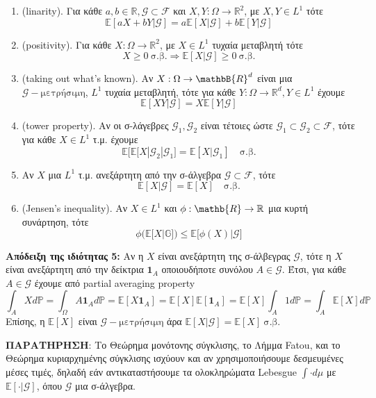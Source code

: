 \documentclass[12pt,a4paper]{article}
\theoremstyle{definition}
\numberwithin{equation}{section}
\begin{document}
\begin{enumerate}
\item \textlatin{(linarity)}. Για κάθε \(a,b \in \mathbb{R}, \mathcal{G} \subset \mathcal{F}\) και \(X,Y : \Omega \rightarrow \mathbb{R}^2\), με \(X,Y \in L^1\) τότε
$$ \mathbb{E}[ aX + bY | \mathcal{G}] = a \mathbb{E}[X|\mathcal{G}] + b \mathbb{E}[Y|\mathcal{G}]$$
\item \textlatin{(positivity)}. Για κάθε \(X:\Omega \rightarrow \mathbb{R}^2\), με \(X \in L^1\) τυχαία μεταβλητή τότε
$$ X \geq 0 \: \text{σ.β.} \Rightarrow \mathbb{E}[X|\mathcal{G}] \geq 0 \: \text{σ.β.} $$
\item \textlatin{(taking out what's known)}. Αν \(X: \Omega \rightarrow \mathbB{R}^d\) είναι μια \(\mathcal{G}-\text{μετρήσιμη}\), \(L^1\) τυχαία μεταβλητή, τότε για κάθε \(Y:\Omega \rightarrow \mathbb{R}^d, Y \in L^1\) έχουμε
$$ \mathbb{E}[XY|\mathcal{G}] = X \mathbb{E}[Y|\mathcal{G}] $$
\item \textlatin{(tower property)}. Αν οι σ-λάγεβρες \(\mathcal{G}_1, \mathcal{G}_2\) είναι τέτοιες ώστε \(\mathcal{G}_1 \subset \mathcal{G}_2 \subset \mathcal{F}\), τότε για κάθε \(X\in L^1\) τ.μ. έχουμε
$$ \mathbb{E}\Big[ \mathbb{E}[X|\mathcal{G}_2 | \mathcal{G}_1 \Big] = \mathbb{E}[X|\mathcal{G}_1] \quad \text{σ.β.}$$
\item Αν \(X\) μια \(L^1\) τ.μ. ανεξάρτητη από την σ-άλγεβρα \(\mathcal{G}\subset \mathcal{F}\), τότε
$$\mathbb{E}[X|\mathcal{G}] = \mathbb{E}[X] \quad \text{σ.β.}$$
\item \textlatin{(Jensen's inequality)}. Αν \(X \in L^1\) και \(\phi :\mathb{R} \rightarrow \mathbb{R}\) μια κυρτή συνάρτηση, τότε
$$ \phi \Big( \mathbb{E}[X|\mathbb{G}] \Big) \leq \mathbb{E}\Big[ \phi(X) | \mathcal{G} \Big]$$
\end{enumerate}


\textbf{Απόδειξη της ιδιότητας 5:} Αν η \(X\) είναι ανεξάρτητη της σ-άλβεγρας \(\mathcal{G}\), τότε η \(X\) είναι ανεξάρτητη από την δείκτρια \(\mathbf{1}_A\) οποιουδήποτε συνόλου \(A \in \mathcal{G}\).
Έτσι, για κάθε \(A \in \mathcal{G}\) έχουμε από \textlatin{partial averaging property}
$$ \int_A X d\mathbb{P} = \int_\Omega A \mathbf{1}_A d\mathbb{P} = \mathbb{E}[X\mathbf{1}_A] = \mathbb{E}[X]\mathbb{E}[\mathbf{1}_A] = \mathbb{E}[X]\int_A 1 d\mathbb{P} = \int_A \mathbb{E}[X] d\mathbb{P}$$
Επίσης, η \(\mathbb{E}[X]\)  είναι \(\mathcal{G}-\text{μετρήσιμη}\) άρα \(\mathbb{E}[X|\mathcal{G}] = \mathbb{E}[X] \: \text{σ.β.}\)

\pagebreak

\textbf{ΠΑΡΑΤΗΡΗΣΗ}: Το Θεώρημα μονότονης σύγκλισης, το Λήμμα \textlatin{Fatou}, και το Θεώρημα κυριαρχημένης σύγκλισης ισχύουν και αν χρησιμοποιήσουμε δεσμευμένες μέσες τιμές, δηλαδή εάν αντικαταστήσουμε τα ολοκληρώματα
\textlatin{Lebesgue} \(\int \cdot d\mu\) με \(\mathbb{E}[\cdot | \mathcal{G}]\), όπου \(\mathcal{G}\) μια σ-άλγεβρα.\\
\end{document}

